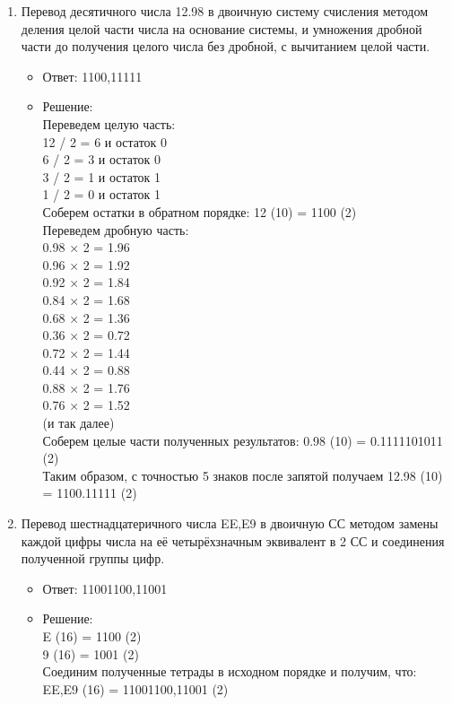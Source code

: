\documentclass[14pt,final,oneside]{extreport}%
\begin{document}
\begin{enumerate}
        \item Перевод десятичного числа 12.98 в двоичную систему счисления методом деления целой части числа на основание системы, и умножения дробной части до получения целого числа без дробной, с вычитанием целой части.
        \begin{itemize}
            \item Ответ: 1100,11111
            \item Решение: \\
                Переведем целую часть: \\
                12 / 2 = 6 и остаток 0 \\
                6 / 2 = 3 и остаток 0 \\
                3 / 2 = 1 и остаток 1 \\
                1 / 2 = 0 и остаток 1 \\
                Соберем остатки в обратном порядке: 12 (10) = 1100 (2) \\
                Переведем дробную часть: \\
                0.98 × 2 = 1.96 \\
                0.96 × 2 = 1.92 \\
                0.92 × 2 = 1.84 \\
                0.84 × 2 = 1.68 \\ 
                0.68 × 2 = 1.36 \\
                0.36 × 2 = 0.72 \\
                0.72 × 2 = 1.44 \\
                0.44 × 2 = 0.88 \\
                0.88 × 2 = 1.76 \\
                0.76 × 2 = 1.52 \\
                (и так далее) \\
                Соберем целые части полученных результатов: 0.98 (10) = 0.1111101011 (2) \\
                Таким образом, с точностью 5 знаков после запятой получаем 	12.98 (10) = 1100.11111 (2) \\
        \end{itemize}

        \item Перевод шестнадцатеричного числа EE,E9 в двоичную СС методом замены каждой цифры числа на её четырёхзначным эквивалент в 2 СС и соединения полученной группы цифр.
        \begin{itemize}
            \item Ответ: 11001100,11001
            \item Решение: \\
                E (16) = 1100 (2) \\
                9 (16) = 1001 (2) \\
                Соединим полученные тетрады в исходном порядке и получим, что: EE,E9 (16) = 11001100,11001 (2)
        \end{itemize}


\end{enumerate}
\end{document}
